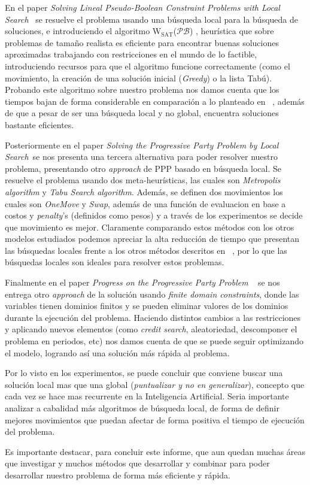 \documentclass[letter, 10pt]{article}
\begin{document}
En el paper \textit{Solving Lineal Pseudo-Boolean Constraint Problems with Local Search}~\cite{Walser:1997:SLP:1867406.1867448} se resuelve el problema usando una búsqueda local para la búsqueda de soluciones, e introduciendo el algoritmo $\text{W}_{\text{SAT}}$($\mathcal{PB}$) , heurística que sobre problemas de tamaño realista es eficiente para encontrar buenas soluciones aproximadas trabajando con restricciones en el mundo de lo factible, introduciendo recursos para que el algoritmo funcione correctamente (como el movimiento, la creación de una solución inicial (\textit{Greedy}) o la lista Tabú). Probando este algoritmo sobre nuestro problema nos damos cuenta que los tiempos bajan de forma considerable en comparación a lo planteado en ~\cite{Smith1996}, además de que a pesar de ser una búsqueda local y no global, encuentra soluciones bastante eficientes. 

Posteriormente en el paper \textit{Solving the Progressive Party Problem by Local Search}~\cite{Galinier1999}se nos presenta una tercera alternativa para poder resolver nuestro problema, presentando otro \textit{approach} de PPP basado en búsqueda local. Se resuelve el problema usando dos meta-heurísticas, las cuales son \textit{Metropolis algorithm} y \textit{Tabu Search algorithm}. Además, se definen dos movimientos los cuales son \textit{OneMove} y \textit{Swap}, además de una función de evaluacion en base a costos y \textit{penalty}'s (definidos como pesos) y a través de los experimentos se decide que movimiento es mejor. Claramente comparando estos métodos con los otros modelos estudiados podemos apreciar la alta reducción de tiempo que presentan las búsquedas locales frente a los otros métodos descritos en ~\cite{Smith1996}, por lo que las búsquedas locales son ideales para resolver estos problemas.

Finalmente en el paper \textit{Progress on the Progressive Party Problem} ~\cite{Simonis2009} se nos entrega otro \textit{approach} de la solución usando \textit{finite domain constraints}, donde las variables tienen dominios finitos y se pueden eliminar valores de los dominios durante la ejecución del problema. Haciendo distintos cambios a las restricciones  y aplicando nuevos elementos (como \textit{credit search}, aleatoriedad, descomponer el problema en periodos, etc) nos damos cuenta de que se puede seguir optimizando el modelo, logrando así una solución más rápida al problema.


Por lo visto en los experimentos, se puede concluir que conviene buscar una solución local mas que una global (\textit{puntualizar y no en generalizar}), concepto que cada vez se hace mas recurrente en la Inteligencia Artificial. Seria importante analizar a cabalidad más algoritmos de búsqueda local, de forma de definir mejores movimientos que puedan afectar de forma positiva el tiempo de ejecución del problema.

Es importante destacar, para concluir este informe, que aun quedan muchas áreas que investigar y muchos métodos que desarrollar y combinar para poder desarrollar nuestro problema de forma más eficiente y rápida.  





\end{document}
